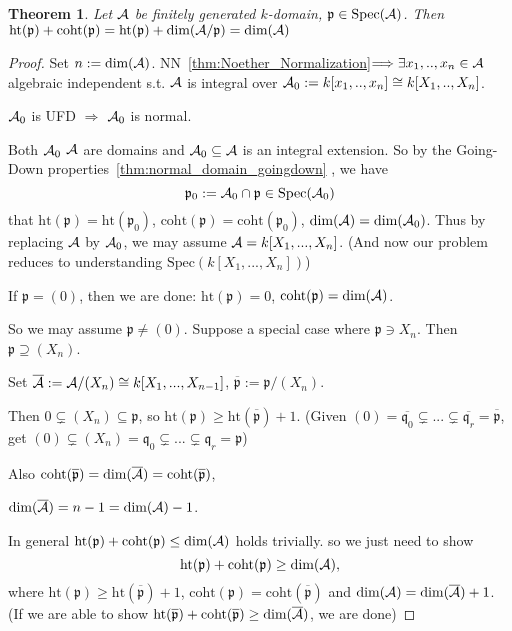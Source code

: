 \documentclass[11pt]{article}
\newtheorem{thm}{Theorem}[section]
\newcommand{\scp}{{\mathfrak p}}
\newcommand{\scq}{\mathfrak q}
\newcommand{\cala}{{\cal A}}
\newcommand{\Lrta}{\Longrightarrow}
\begin{document}
\begin{thm}\label{thm:finitelygeneratedk-domain_dim_equality}
Let $\cala$ be finitely generated $k$-domain, $\scp\in \text{Spec}(\cala)$. Then $\text{ht}(\scp)+\text{coht}(\scp)=\text{ht}(\scp)+\text{dim}(\cala/\scp)=\text{dim}(\cala)$
\end{thm}
\begin{proof}
Set $n:=\text{dim}(\cala)$. $\text{NN}$~\ref{thm:Noether_Normalization}$\Lrta\exists x_1,..,x_n\in\cala$ algebraic independent s.t. $\cala$ is integral over $\cala_0:=k[x_1,..,x_n]\cong k[X_1,..,X_n]$.

$\cala_0$ is UFD $\Lrta$ $\cala_0$ is normal.

Both $\cala_0$  $\cala$  are domains and $\cala_0\subseteq \cala$ is an integral extension. So by the Going-Down properties~\ref{thm:normal_domain_goingdown} , we have 
$$
\scp_0:=\cala_0\cap\scp\in \text{Spec}(\cala_0)
$$
that 
$\text{ht}(\scp)=\text{ht}(\scp_0)$, $\text{coht}(\scp)=\text{coht}(\scp_0)$, 
$\text{dim}(\cala)=\text{dim}(\cala_0)$. Thus by replacing $\cala$ by $\cala_0$, we may assume $\cala=k[X_1,...,X_n]$. (And now our problem reduces to understanding $\text{Spec}(k[X_1,...,X_n])$)

If $\scp=(0)$, then we are done: $\text{ht}(\scp)=0$, $\text{coht}(\scp)=\text{dim}(\cala)$. 

So we may assume $\scp\neq (0)$.
Suppose a special case where $\scp\ni X_n$. Then $\scp\supseteq (X_n)$. 

Set $\overline{\cala}:=\cala/(X_n)\cong k[X_1,...,X_{n-1}]$, $\overline{\scp}:=\scp/(X_n)$.

Then $0\subsetneq (X_n)\subseteq \scp$, so $\text{ht}(\scp)\geq \text{ht}(\overline{\scp})+1$.
(Given $(0)=\overline{\scq_0}\subsetneq ...\subsetneq \overline{\scq_r}=\overline{\scp}$, get $(0)\subsetneq (X_n)=\scq_0\subsetneq...\subsetneq \scq_r=\scp $)

Also $\text{coht}(\overline{\scp})=\text{dim}(\overline{\cala})=\text{coht}(\overline{\scp})$,

 $\text{dim}(\overline{\cala})=n-1=\text{dim}(\cala)-1$.

In general $\text{ht}(\scp)+\text{coht}(\scp)\leq \text{dim}(\cala)$ holds trivially. so we just need to show
 $$\text{ht}(\scp)+\text{coht}(\scp)\geq \text{dim}(\cala),$$
  where $\text{ht}(\scp)\geq \text{ht}(\overline{\scp})+1$, $\text{coht}(\scp)=\text{coht}(\overline{\scp})$ and $\text{dim}(\cala)=\text{dim}(\overline{\cala})+1$. (If we are able to show $\text{ht}(\overline{\scp})+\text{coht}(\overline{\scp})\geq \text{dim}(\overline{\cala})$, we are done)


\end{proof}
\end{document}
